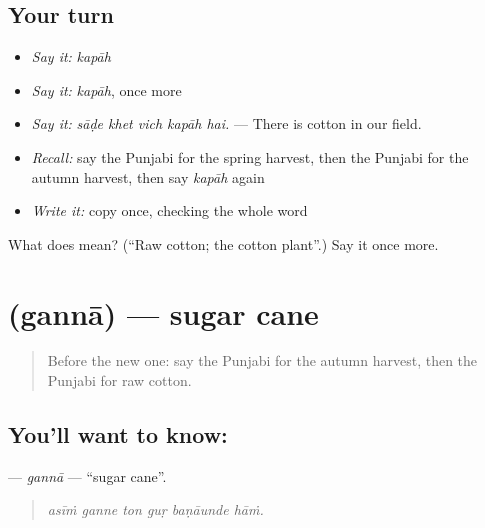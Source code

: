 \subsection*{Your turn}
\begin{itemize}
\raggedright
  \item \emph{Say it:} \emph{kapāh}
  \item \emph{Say it:} \emph{kapāh}, once more
  \item \emph{Say it:} \emph{sāḍe khet vich kapāh hai.} — There is cotton in our field.
  \item \emph{Recall:} say the Punjabi for the spring harvest, then the Punjabi for the autumn harvest, then say \emph{kapāh} again
  \item \emph{Write it:} copy \textbf{} once, checking the whole word
\end{itemize}

\begin{tcolorbox}[breakable,colback=teal!4,colframe=teal!35!black,title={Before you move on}]
What does  mean? (\textquotedblleft{}Raw cotton; the cotton plant\textquotedblright{}.) Say it once more.
\end{tcolorbox}
\section[\texorpdfstring{\pa{ਗੰਨਾ} (gannā)}{ਗੰਨਾ (gannā)}]{ (gannā) — sugar cane}

\label{lesson:PA-C300-ganna}



\begin{quote}
Before the new one: say the Punjabi for the autumn harvest, then the Punjabi for raw cotton.
\end{quote}

\subsection*{You'll want to know: }
\textbf{} — \emph{gannā} — \textquotedblleft{}sugar cane\textquotedblright{}.

\begin{quote}
     
\end{quote}

\begin{quote}
\emph{asīṁ ganne ton guṛ baṇāunde hāṁ.}
\end{quote}

